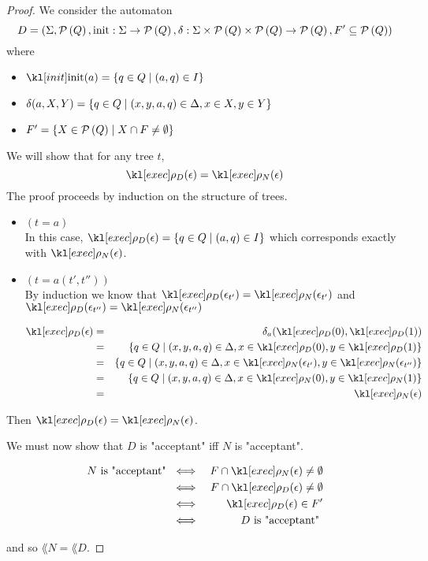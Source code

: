 \documentclass{article}
\begin{document}
\begin{proof}
	We consider the automaton
	$$ D = (\Sigma, \mathcal{P}\left(Q\right), \text{init} : \Sigma \to \mathcal{P}\left(Q\right), \delta : \Sigma \times \mathcal{P}\left(Q\right) \times \mathcal{P}\left(Q\right) \to \mathcal{P}\left(Q\right), F' \subseteq \mathcal{P}\left(Q\right)) $$
	where
	\begin{itemize}
		\item $\init (a) = \setdef {q \in Q} {(a,q) \in I}$
		\item $\delta (a, X, Y) = \left\{q \in  Q \mid (x,y,a,q) \in \Delta, x \in X, y \in Y\right\}$
		\item $F' = \left\{X \in \mathcal{P}\left(Q\right) \mid X \cap F \neq \emptyset\right\}$
	\end{itemize}

	We will show that for any tree $t$,
	$$ \exec D (\epsilon)  = \exec N (\epsilon)$$
	The proof proceeds by induction on the structure of trees.
	\begin{itemize}
		\item $(t = a)$\\
		      In this case, $\exec D (\epsilon) = \setdef {q \in Q} {(a,q) \in I}$ which corresponds
		      exactly with $\exec N (\epsilon)$.

		\item $(t = a(t',t''))$\\
		      By induction we know that
		      $\exec D (\epsilon_{t'}) = \exec N ({\epsilon_{t'}})$
		      and
		      $\exec D (\epsilon_{t''}) =  \exec N ({\epsilon_{t''}})$

		      \begin{eqnarray*}
			      \exec D (\epsilon) &=& \delta_a(\exec D (0), \exec D (1)) \\
			      &=& \setdef {q \in  Q} {(x,y,a,q) \in \Delta, x \in \exec D (0), y \in \exec D (1)}\\
			      &=& \setdef {q \in  Q} {(x,y,a,q) \in \Delta, x \in \exec N ({\epsilon_{t'}}), y \in \exec N ({\epsilon_{t''}})}\\
			      &=& \setdef {q \in  Q} {(x,y,a,q) \in \Delta, x \in \exec N (0), y \in \exec N (1)}\\
			      &=& \exec N (\epsilon)
		      \end{eqnarray*}
	\end{itemize}
	Then $ \exec D (\epsilon)  = \exec N (\epsilon)$.


	We must now show that $D$ is "acceptant" iff $N$ is "acceptant".

	\begin{eqnarray*}
		N \text{ is "acceptant" } &\iff& F \cap \exec N (\epsilon) \neq \emptyset \\
		&\iff& F \cap \exec D (\epsilon) \neq \emptyset \\
		&\iff& \exec D (\epsilon) \in F' \\
		&\iff& D \text{ is "acceptant" }
	\end{eqnarray*}

	and so $\lang N = \lang D$.

\end{proof}
\end{document}
